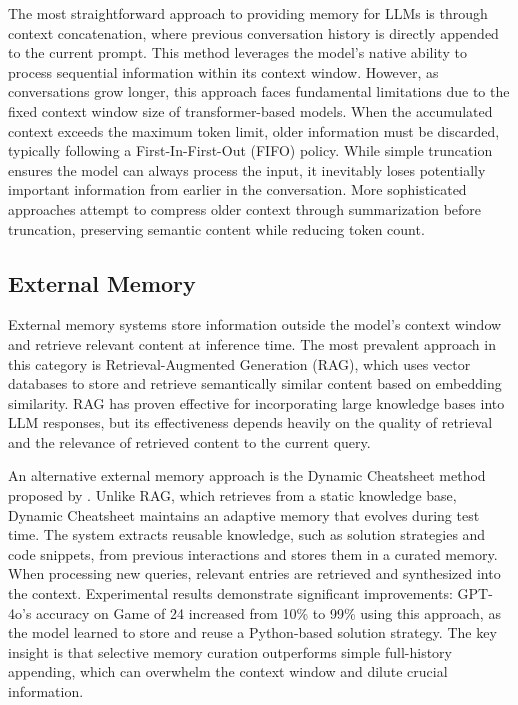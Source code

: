 \documentclass{article} %
\begin{document}
The most straightforward approach to providing memory for LLMs is through context concatenation, where previous conversation history is directly appended to the current prompt. This method leverages the model's native ability to process sequential information within its context window. However, as conversations grow longer, this approach faces fundamental limitations due to the fixed context window size of transformer-based models. When the accumulated context exceeds the maximum token limit, older information must be discarded, typically following a First-In-First-Out (FIFO) policy. While simple truncation ensures the model can always process the input, it inevitably loses potentially important information from earlier in the conversation. More sophisticated approaches attempt to compress older context through summarization before truncation, preserving semantic content while reducing token count.

\subsection{External Memory}

External memory systems store information outside the model's context window and retrieve relevant content at inference time. The most prevalent approach in this category is Retrieval-Augmented Generation (RAG), which uses vector databases to store and retrieve semantically similar content based on embedding similarity. RAG has proven effective for incorporating large knowledge bases into LLM responses, but its effectiveness depends heavily on the quality of retrieval and the relevance of retrieved content to the current query.

An alternative external memory approach is the Dynamic Cheatsheet method proposed by \citet{banerjee2024dynamic}. Unlike RAG, which retrieves from a static knowledge base, Dynamic Cheatsheet maintains an adaptive memory that evolves during test time. The system extracts reusable knowledge, such as solution strategies and code snippets, from previous interactions and stores them in a curated memory. When processing new queries, relevant entries are retrieved and synthesized into the context. Experimental results demonstrate significant improvements: GPT-4o's accuracy on Game of 24 increased from 10\% to 99\% using this approach, as the model learned to store and reuse a Python-based solution strategy. The key insight is that selective memory curation outperforms simple full-history appending, which can overwhelm the context window and dilute crucial information.
\end{document}
